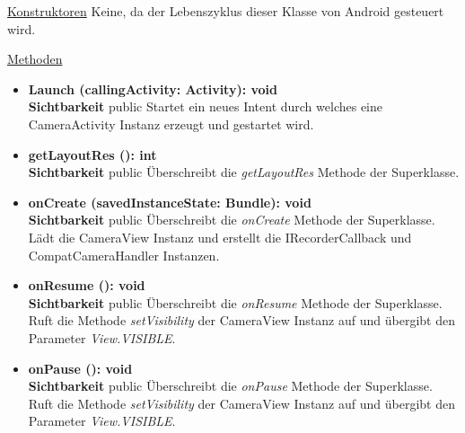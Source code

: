 \underline{Konstruktoren}\newline
\indent Keine, da der Lebenszyklus dieser Klasse von Android gesteuert wird.\newline

\underline{Methoden}
\begin{itemize}
\itemsep0pt

\item \textbf{Launch (callingActivity: Activity): void}\hfill\\
\textbf{Sichtbarkeit} public\newline
Startet ein neues Intent durch welches eine CameraActivity Instanz erzeugt und gestartet wird.

\item \textbf{getLayoutRes (): int}\hfill\\
\textbf{Sichtbarkeit} public\newline
Überschreibt die \textit{getLayoutRes} Methode der Superklasse.

\item \textbf{onCreate (savedInstanceState: Bundle): void}\hfill\\
\textbf{Sichtbarkeit} public\newline
Überschreibt die \textit{onCreate} Methode der Superklasse. Lädt die CameraView Instanz und erstellt die IRecorderCallback und CompatCameraHandler Instanzen.

\item \textbf{onResume (): void}\hfill\\
\textbf{Sichtbarkeit} public\newline
Überschreibt die \textit{onResume} Methode der Superklasse. Ruft die Methode \textit{setVisibility} der CameraView Instanz auf und übergibt den Parameter \textit{View.VISIBLE}.

\item \textbf{onPause (): void}\hfill\\
\textbf{Sichtbarkeit} public\newline
Überschreibt die \textit{onPause} Methode der Superklasse. Ruft die Methode \textit{setVisibility} der CameraView Instanz auf und übergibt den Parameter \textit{View.VISIBLE}.

\end{itemize}